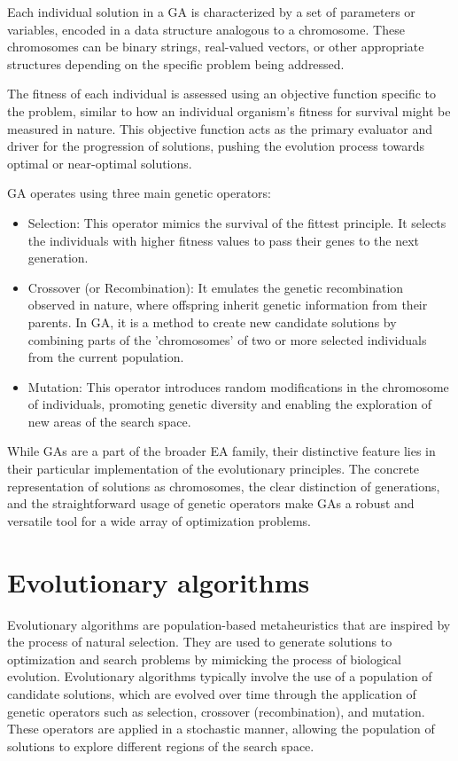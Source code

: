 \documentclass[twoside]{ctuthesis}
\theoremstyle{plain}
\theoremstyle{definition}
\theoremstyle{note}
\begin{document}
Each individual solution in a GA is characterized by a set of parameters or variables, encoded in a data structure analogous to a chromosome. These chromosomes can be binary strings, real-valued vectors, or other appropriate structures depending on the specific problem being addressed.

The fitness of each individual is assessed using an objective function specific to the problem, similar to how an individual organism's fitness for survival might be measured in nature. This objective function acts as the primary evaluator and driver for the progression of solutions, pushing the evolution process towards optimal or near-optimal solutions.

GA operates using three main genetic operators:
\begin{itemize}
	\item Selection: This operator mimics the survival of the fittest principle. It selects the individuals with higher fitness values to pass their genes to the next generation.
	\item Crossover (or Recombination): It emulates the genetic recombination observed in nature, where offspring inherit genetic information from their parents. In GA, it is a method to create new candidate solutions by combining parts of the 'chromosomes' of two or more selected individuals from the current population.
	\item Mutation: This operator introduces random modifications in the chromosome of individuals, promoting genetic diversity and enabling the exploration of new areas of the search space.
\end{itemize}

While GAs are a part of the broader EA family, their distinctive feature lies in their particular implementation of the evolutionary principles. The concrete representation of solutions as chromosomes, the clear distinction of generations, and the straightforward usage of genetic operators make GAs a robust and versatile tool for a wide array of optimization problems.

\section{Evolutionary algorithms}

Evolutionary algorithms are population-based metaheuristics that are inspired by the process of natural selection. They are used to generate solutions to optimization and search problems by mimicking the process of biological evolution. Evolutionary algorithms typically involve the use of a population of candidate solutions, which are evolved over time through the application of genetic operators such as selection, crossover (recombination), and mutation. These operators are applied in a stochastic manner, allowing the population of solutions to explore different regions of the search space.
\end{document}
